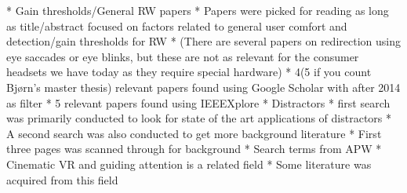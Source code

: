     * Gain thresholds/General RW papers
        * Papers were picked for reading as long as title/abstract focused on factors related to general user comfort and detection/gain thresholds for RW
        * (There are several papers on redirection using eye saccades or eye blinks, but these are not as relevant for the consumer headsets we have today as they require special hardware)
        * 4(5 if you count Bjørn's master thesis) relevant papers found using Google Scholar with after 2014 as filter
        * 5 relevant papers found using IEEEXplore
    * Distractors
       * first search was primarily conducted to look for state of the art applications of distractors
       * A second search was also conducted to get more background literature
          * First three pages was scanned through for background
    * Search terms from APW
       * Cinematic VR and guiding attention is a related field
       * Some literature was acquired from this field
       